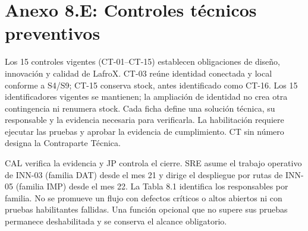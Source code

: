 \clearpage
\section{Anexo 8.E: Controles técnicos preventivos}
Los 15 controles vigentes (CT-01--CT-15) establecen obligaciones de diseño, innovación y calidad de LafroX. CT-03 reúne identidad conectada y local conforme a S4/S9; CT-15 conserva stock, antes identificado como CT-16. Los 15 identificadores vigentes se mantienen; la ampliación de identidad no crea otra contingencia ni renumera stock. Cada ficha define una solución técnica, su responsable y la evidencia necesaria para verificarla. La habilitación requiere ejecutar las pruebas y aprobar la evidencia de cumplimiento. CT sin número designa la Contraparte Técnica.

CAL verifica la evidencia y JP controla el cierre. SRE asume el trabajo operativo de INN-03 (familia DAT) desde el mes 21 y dirige el despliegue por rutas de INN-05 (familia IMP) desde el mes 22. La Tabla 8.1 identifica los responsables por familia. No se promueve un flujo con defectos críticos o altos abiertos ni con pruebas habilitantes fallidas. Una función opcional que no supere sus pruebas permanece deshabilitada y se conserva el alcance obligatorio.


